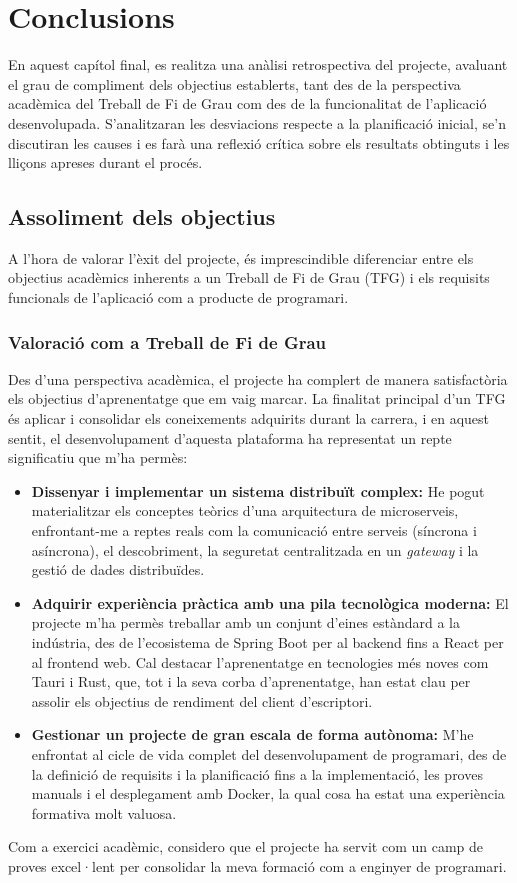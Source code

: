 \chapter{Conclusions}

En aquest capítol final, es realitza una anàlisi retrospectiva del projecte, avaluant el grau de compliment dels objectius establerts, tant des de la perspectiva acadèmica del Treball de Fi de Grau com des de la funcionalitat de l'aplicació desenvolupada. S'analitzaran les desviacions respecte a la planificació inicial, se'n discutiran les causes i es farà una reflexió crítica sobre els resultats obtinguts i les lliçons apreses durant el procés.

\section{Assoliment dels objectius}

A l'hora de valorar l'èxit del projecte, és imprescindible diferenciar entre els objectius acadèmics inherents a un Treball de Fi de Grau (TFG) i els requisits funcionals de l'aplicació com a producte de programari.

\subsection{Valoració com a Treball de Fi de Grau}

Des d'una perspectiva acadèmica, el projecte ha complert de manera satisfactòria els objectius d'aprenentatge que em vaig marcar. La finalitat principal d'un TFG és aplicar i consolidar els coneixements adquirits durant la carrera, i en aquest sentit, el desenvolupament d'aquesta plataforma ha representat un repte significatiu que m'ha permès:
\begin{itemize}
    \item \textbf{Dissenyar i implementar un sistema distribuït complex:} He pogut materialitzar els conceptes teòrics d'una arquitectura de microserveis, enfrontant-me a reptes reals com la comunicació entre serveis (síncrona i asíncrona), el descobriment, la seguretat centralitzada en un \textit{gateway} i la gestió de dades distribuïdes.
    \item \textbf{Adquirir experiència pràctica amb una pila tecnològica moderna:} El projecte m'ha permès treballar amb un conjunt d'eines estàndard a la indústria, des de l'ecosistema de Spring Boot per al backend fins a React per al frontend web. Cal destacar l'aprenentatge en tecnologies més noves com Tauri i Rust, que, tot i la seva corba d'aprenentatge, han estat clau per assolir els objectius de rendiment del client d'escriptori.
    \item \textbf{Gestionar un projecte de gran escala de forma autònoma:} M'he enfrontat al cicle de vida complet del desenvolupament de programari, des de la definició de requisits i la planificació fins a la implementació, les proves manuals i el desplegament amb Docker, la qual cosa ha estat una experiència formativa molt valuosa.
\end{itemize}
Com a exercici acadèmic, considero que el projecte ha servit com un camp de proves excel·lent per consolidar la meva formació com a enginyer de programari.

